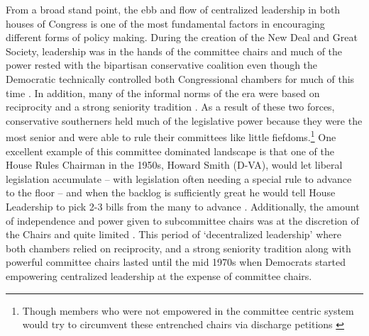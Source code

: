 \documentclass[12pt]{article}
\begin{document}
From a broad stand point, the ebb and flow of centralized leadership in both houses of Congress is one of the most fundamental factors in encouraging different forms of policy making. During the creation of the New Deal and Great Society, leadership was in the hands of the committee chairs and much of the power rested with the bipartisan conservative coalition even though the Democratic technically controlled both Congressional chambers for much of this time \citep{shelley1983, shepsle1989, polsby2004}. In addition, many of the informal norms of the era were based on reciprocity and a strong seniority tradition \citep{matthews1960, asher1973}. As a result of these two forces, conservative southerners held much of the legislative power because they were the most senior and were able to rule their committees like little fiefdoms.\footnote{Though members who were not empowered in the committee centric system would try to circumvent these entrenched chairs via discharge petitions \citep{pearson2009}} One excellent example of this committee dominated landscape is that one of the House Rules Chairman in the 1950s, Howard Smith (D-VA), would let liberal legislation accumulate -- with legislation often needing a special rule to advance to the floor -- and when the backlog is sufficiently great he would tell House Leadership to pick 2-3 bills from the many to advance \cite[pg. 14]{polsby2004}. Additionally, the amount of independence and power given to subcommittee chairs was at the discretion of the Chairs and quite limited \citep{rohde1974}. This period of `decentralized leadership' where both chambers relied on reciprocity, and a strong seniority tradition along with powerful committee chairs lasted until the mid 1970s when Democrats started empowering centralized leadership at the expense of committee chairs.
\end{document}
